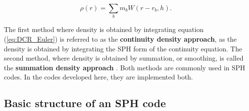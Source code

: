 \documentclass[11pt,a4paper,twoside]{report}
\begin{document}
\begin{equation}
\label{eq:SumDensity}
\rho(r)=\sum_b m_b W(r-r_b,h).
\end{equation}

The first method where density is obtained by integrating equation (\ref{eq:DCR_Euler}) is referred 
to as the {\bf continuity density approach}, as the density is obtained by integrating the SPH form of the continuity equation. The second method, where density is obtained by 
summation, or smoothing, is called the {\bf summation density approach} \cite{Liu2003}. 
Both methods are commonly used in SPH codes. In the codes developed here, they are implemented both.

\subsection{Basic structure of an SPH code}
\end{document}
